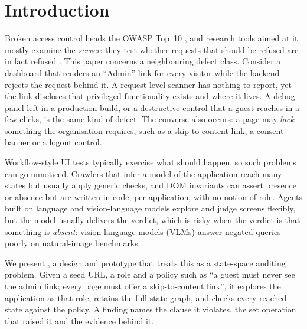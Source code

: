 \section{Introduction}
\label{sec:intro}

Broken access control heads the OWASP Top~10 \cite{owasp2021a01}, and research tools
aimed at it mostly examine the \emph{server}: they test whether requests that
should be refused are in fact refused
\cite{sun2011static,li2014blackbox,noseevich2011detecting,monshizadeh2014mace,liu2025bacscan}.
This paper concerns a neighbouring defect class. Consider a dashboard that renders
an ``Admin'' link for every visitor while the backend rejects the request behind
it. A request-level scanner has nothing to report, yet the link discloses that
privileged functionality exists and where it lives. A debug panel left in a
production build, or a destructive control that a guest reaches in a few clicks,
is the same kind of defect. The converse also occurs: a page may \emph{lack}
something the organisation requires, such as a skip-to-content link, a consent
banner or a logout control.

Workflow-style UI tests typically exercise what should happen, so such
problems can go unnoticed. Crawlers that infer a model of the application
\cite{mesbah2012crawljax,memon2003ripping,dallmeier2013webmate} reach many states
but usually apply generic checks, and DOM invariants \cite{mesbah2012invariant}
can assert presence or absence but are written in code, per application, with no
notion of role. Agents built on language and
vision-language models
\cite{liu2024gptdroid,yoon2024droidagent,liu2024visiondroid,zheng2024seeact}
explore and judge screens flexibly, but the model usually delivers the verdict,
which is risky when the verdict is that something is \emph{absent}:
vision-language models (VLMs) answer negated queries poorly on natural-image
benchmarks \cite{alhamoud2025negation}.

We present \sys{}, a design and prototype that treats this as a state-space auditing
problem. Given a seed URL, a role and a policy such as ``a guest must never see the
admin link; every page must offer a skip-to-content link'', it explores the
application as that role, retains the full state graph, and checks every reached
state against the policy. A finding names the clause it violates, the set
operation that raised it and the evidence behind it.

